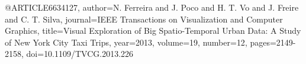 @ARTICLE{6634127,
  author={N. {Ferreira} and J. {Poco} and H. T. {Vo} and J. {Freire} and C. T. {Silva}},
  journal={IEEE Transactions on Visualization and Computer Graphics}, 
  title={Visual Exploration of Big Spatio-Temporal Urban Data: A Study of New York City Taxi Trips}, 
  year={2013},
  volume={19},
  number={12},
  pages={2149-2158},
  doi={10.1109/TVCG.2013.226}}